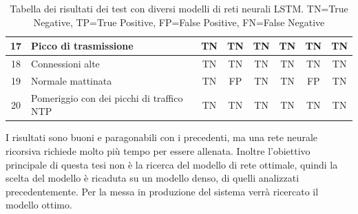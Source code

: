\begin{table}
\begin{tabularx}{\textwidth}{||c X c c c c c c||}
        \hline
        17 & Picco di trasmissione & TN & TN & TN & TN & TN & TN\\        
        \hline
        18 & Connessioni alte & TN & TN & TN & TN & TN & TN\\
        \hline
        19 & Normale mattinata & TN & FP & TN & TN & FP & TN\\ 
        \hline
        20 & Pomeriggio con dei picchi di traffico NTP & TN & TN & TN & TN & TN & TN\\ 
        \hline
    \end{tabularx}
    \caption{Tabella dei risultati dei test con diversi modelli di reti neurali LSTM. TN=True Negative, TP=True Positive, FP=False Positive, FN=False Negative}
    \label{table:LSTM_tests}
\end{table}

I risultati sono buoni e paragonabili con i precedenti, ma una rete neurale ricorsiva richiede molto più tempo per essere allenata. Inoltre l'obiettivo principale di questa tesi non è la ricerca del modello di rete ottimale, quindi la scelta del modello è ricaduta su un modello denso, di quelli analizzati precedentemente. Per la messa in produzione del sistema verrà ricercato il modello ottimo.